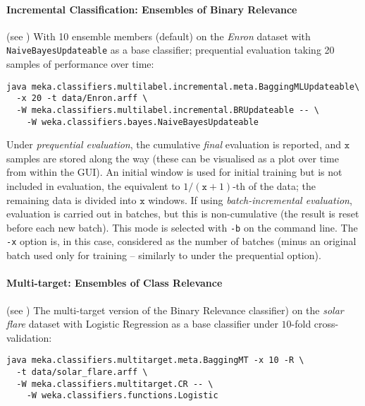 \documentclass[11pt]{article}
\begin{document}


\paragraph{Incremental Classification: Ensembles of Binary Relevance} (see \cite{ECC2,MEDS2}) With 10 ensemble members (default) on the \textit{Enron} dataset with \texttt{NaiveBayesUpdateable} as a base classifier; prequential evaluation taking 20 samples of performance over time:

\begin{lstlisting}
java meka.classifiers.multilabel.incremental.meta.BaggingMLUpdateable\
  -x 20 -t data/Enron.arff \
  -W meka.classifiers.multilabel.incremental.BRUpdateable -- \
    -W weka.classifiers.bayes.NaiveBayesUpdateable
\end{lstlisting}

Under \emph{prequential evaluation}, the cumulative \emph{final} evaluation is reported, and $\texttt{x}$ samples are stored along the way (these can be visualised as a plot over time from within the GUI). An initial window is used for initial training but is not included in evaluation, the equivalent to $1/(\texttt{x}+1)$-th of the data; the remaining data is divided into $\texttt{x}$ windows. If using \emph{batch-incremental evaluation}, evaluation is carried out in batches, but this is non-cumulative (the result is reset before each new batch). This mode is selected with \texttt{-b} on the command line. The \texttt{-x} option is, in this case, considered as the number of batches (minus an original batch used only for training -- similarly to under the prequential option).

\paragraph{Multi-target: Ensembles of Class Relevance} (see \cite{UPM}) The multi-target version of the Binary Relevance classifier) on the \textit{solar flare} dataset with Logistic Regression as a base classifier under $10$-fold cross-validation:
\begin{lstlisting}
java meka.classifiers.multitarget.meta.BaggingMT -x 10 -R \
  -t data/solar_flare.arff \
  -W meka.classifiers.multitarget.CR -- \
    -W weka.classifiers.functions.Logistic
\end{lstlisting}
 
\end{document}
